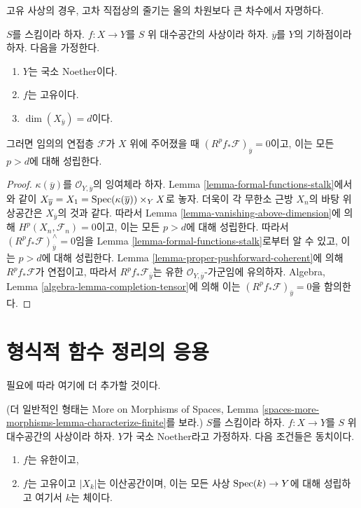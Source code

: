 \begin{lemma}
\label{lemma-higher-direct-images-zero-above-dimension-fibre}
\begin{slogan}
고유 사상의 경우, 고차 직접상의 줄기는 올의 차원보다 큰 차수에서
자명하다.
\end{slogan}
$S$를 스킴이라 하자. $f : X \to Y$를 $S$ 위 대수공간의 사상이라
하자. $\overline{y}$를 $Y$의 기하점이라 하자. 다음을 가정한다.
\begin{enumerate}
\item $Y$는 국소 Noether이다.
\item $f$는 고유이다.
\item $\dim(X_{\overline{y}}) = d$이다.
\end{enumerate}
그러면 임의의 연접층 $\mathcal{F}$가 $X$ 위에 주어졌을 때
$(R^pf_*\mathcal{F})_{\overline{y}} = 0$이고, 이는 모든 $p > d$에
대해 성립한다.
\end{lemma}

\begin{proof}
$\kappa(\overline{y})$를 $\mathcal{O}_{Y, \overline{y}}$의 잉여체라
하자. Lemma \ref{lemma-formal-functions-stalk}에서와 같이
$X_{\overline{y}} = X_1 = \mathop{\mathrm{Spec}}(\kappa(\overline{y})) \times_Y X$로
놓자. 더욱이 각 무한소 근방 $X_n$의 바탕 위상공간은
$X_{\overline{y}}$의 것과 같다. 따라서 Lemma
\ref{lemma-vanishing-above-dimension}에 의해
$H^p(X_n, \mathcal{F}_n) = 0$이고, 이는 모든 $p > d$에 대해
성립한다. 따라서
$(R^pf_*\mathcal{F})_{\overline{y}}^\wedge = 0$임을 Lemma
\ref{lemma-formal-functions-stalk}로부터 알 수 있고, 이는 $p > d$에
대해 성립한다.
Lemma \ref{lemma-proper-pushforward-coherent}에 의해
$R^pf_*\mathcal{F}$가 연접이고, 따라서
$R^pf_*\mathcal{F}_{\overline{y}}$는 유한
$\mathcal{O}_{Y, \overline{y}}$-가군임에 유의하자. Algebra, Lemma
\ref{algebra-lemma-completion-tensor}에 의해 이는
$(R^pf_*\mathcal{F})_{\overline{y}} = 0$을 함의한다.
\end{proof}






\section{형식적 함수 정리의 응용}
\label{section-applications-formal-functions}

\noindent
필요에 따라 여기에 더 추가할 것이다.

\begin{lemma}
\label{lemma-characterize-finite}
(더 일반적인 형태는 More on Morphisms of Spaces, Lemma
\ref{spaces-more-morphisms-lemma-characterize-finite}를 보라.)
$S$를 스킴이라 하자. $f : X \to Y$를 $S$ 위 대수공간의 사상이라
하자. $Y$가 국소 Noether라고 가정하자. 다음 조건들은 동치이다.
\begin{enumerate}
\item $f$는 유한이고,
\item $f$는 고유이고 $|X_k|$는 이산공간이며, 이는 모든 사상
$\mathop{\mathrm{Spec}}(k) \to Y$에 대해 성립하고 여기서 $k$는 체이다.
\end{enumerate}
\end{lemma}

